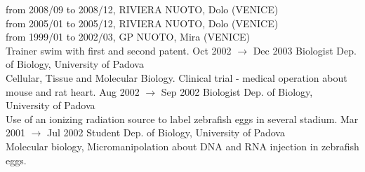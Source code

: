 \documentclass[8pt]{stackoverflow-upgraded-version} %
\begin{document}
\begin{entrylist}
{		from 2008/09 to 2008/12, RIVIERA NUOTO, Dolo (VENICE)\\
		from 2005/01 to 2005/12, RIVIERA NUOTO, Dolo (VENICE)\\
		from 1999/01 to 2002/03, GP NUOTO, Mira (VENICE)\\
		Trainer swim with first and second patent.}
	\entry
		{Oct 2002 $\rightarrow$ Dec 2003}
		{Biologist}
		{Dep. of Biology, University of Padova}
		{\\
		Cellular, Tissue and Molecular Biology. Clinical trial - medical operation about mouse and rat heart.}
	\entry
		{Aug 2002 $\rightarrow$ Sep 2002}
		{Biologist}
		{Dep. of Biology, University of Padova}
		{\\
		Use of an ionizing radiation source to label zebrafish eggs in several stadium.}
	\entry
		{Mar 2001 $\rightarrow$ Jul 2002}
		{Student}
		{Dep. of Biology, University of Padova}
		{\\
		Molecular biology, Micromanipolation about DNA and RNA injection in zebrafish eggs.}
\end{entrylist}
\end{document}
